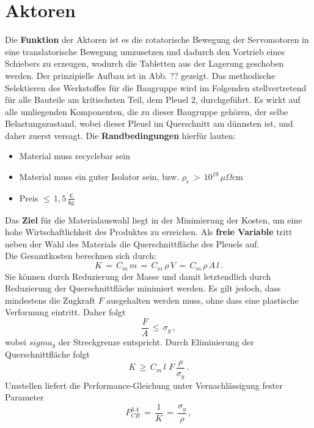 \section{Aktoren}
Die \textbf{Funktion} der Aktoren ist es die rotatorische Bewegung der Servomotoren in eine translatorische Bewegung umzusetzen und dadurch den Vortrieb eines Schiebers zu erzeugen, wodurch die Tabletten aus der Lagerung geschoben werden. Der prinzipielle Aufbau ist in Abb. ?? gezeigt. Das methodische Selektieren des Werkstoffes für die Baugruppe wird im Folgenden stellvertretend für alle Bauteile am kritischsten Teil, dem Pleuel 2, durchgeführt. Es wirkt auf alle umliegenden Komponenten, die zu dieser Baugruppe gehören, der selbe Belastungszustand, wobei dieser Pleuel im Querschnitt am dünnsten ist, und daher zuerst versagt. Die \textbf{Randbedingungen} hierfür lauten:
\begin{itemize}
	\item Material muss recyclebar sein
	\item Material muss ein guter Isolator sein, bzw. $\rho_e\,>\,10^{19}\,\mu\Omega$cm
	\item Preis $\le\,1,5\,\frac{\text{€}}{\text{kg}}$
\end{itemize}
Das \textbf{Ziel} für die Materialauswahl liegt in der Minimierung der Kosten, um eine hohe Wirtschaftlichkeit des Produktes zu erreichen. Als \textbf{freie Variable} tritt neben der Wahl des Materials die Querschnittfläche des Pleuels auf.\\
Die Gesamtkosten berechnen sich durch:
\begin{equation}
	K\,=\,C_m\,m\,=\,C_m\,\rho\,V\,=\,C_m\,\rho\,A\,l\,.
\end{equation}
Sie können durch Reduzierung der Masse und damit letztendlich durch Reduzierung der Querschnittfläche minimiert werden. Es gilt jedoch, dass mindestens die Zugkraft $F$ ausgehalten werden muss, ohne dass eine plastische Verformung eintritt. Daher folgt
\begin{equation}
	\frac{F}{A}\,\le\,\sigma_y\,,
\end{equation}
wobei $sigma_y$ der Streckgrenze entspricht.
Durch Eliminierung der Querschnittfläche folgt
\begin{equation}
K\,\ge\,C_m\,l\,\,F\,\frac{\rho}{\sigma_y}\,.
\end{equation}
Umstellen liefert die Performance-Gleichung unter Vernachlässigung fester Parameter
\begin{equation}\label{performance34}
P_{CR}^{3.4}\,=\,\frac{1}{K}\,=\,\frac{\sigma_y}{\rho}\,,
\end{equation}

